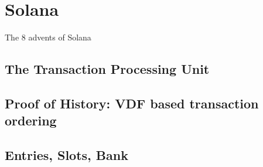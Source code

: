 
\chapter{Solana}
The 8 advents of Solana
\section{The Transaction Processing Unit}
\section{Proof of History: VDF based transaction ordering}
\section{Entries, Slots, Bank}